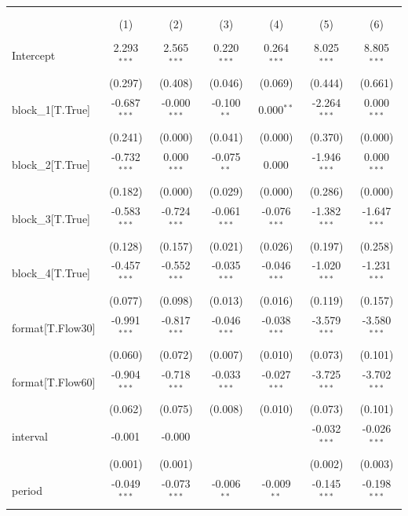 \begin{table}[!htbp] \centering
\begin{tabular}{@{\extracolsep{5pt}}lcccccc}
\\[-1.8ex]\hline
\hline \\[-1.8ex]
\\[-1.8ex] & (1) & (2) & (3) & (4) & (5) & (6) \\
\hline \\[-1.8ex]
 Intercept & 2.293$^{***}$ & 2.565$^{***}$ & 0.220$^{***}$ & 0.264$^{***}$ & 8.025$^{***}$ & 8.805$^{***}$ \\
& (0.297) & (0.408) & (0.046) & (0.069) & (0.444) & (0.661) \\
 block_1[T.True] & -0.687$^{***}$ & -0.000$^{***}$ & -0.100$^{**}$ & 0.000$^{**}$ & -2.264$^{***}$ & 0.000$^{***}$ \\
& (0.241) & (0.000) & (0.041) & (0.000) & (0.370) & (0.000) \\
 block_2[T.True] & -0.732$^{***}$ & 0.000$^{***}$ & -0.075$^{**}$ & 0.000$^{}$ & -1.946$^{***}$ & 0.000$^{***}$ \\
& (0.182) & (0.000) & (0.029) & (0.000) & (0.286) & (0.000) \\
 block_3[T.True] & -0.583$^{***}$ & -0.724$^{***}$ & -0.061$^{***}$ & -0.076$^{***}$ & -1.382$^{***}$ & -1.647$^{***}$ \\
& (0.128) & (0.157) & (0.021) & (0.026) & (0.197) & (0.258) \\
 block_4[T.True] & -0.457$^{***}$ & -0.552$^{***}$ & -0.035$^{***}$ & -0.046$^{***}$ & -1.020$^{***}$ & -1.231$^{***}$ \\
& (0.077) & (0.098) & (0.013) & (0.016) & (0.119) & (0.157) \\
 format[T.Flow30] & -0.991$^{***}$ & -0.817$^{***}$ & -0.046$^{***}$ & -0.038$^{***}$ & -3.579$^{***}$ & -3.580$^{***}$ \\
& (0.060) & (0.072) & (0.007) & (0.010) & (0.073) & (0.101) \\
 format[T.Flow60] & -0.904$^{***}$ & -0.718$^{***}$ & -0.033$^{***}$ & -0.027$^{***}$ & -3.725$^{***}$ & -3.702$^{***}$ \\
& (0.062) & (0.075) & (0.008) & (0.010) & (0.073) & (0.101) \\
 interval & -0.001$^{}$ & -0.000$^{}$ & & & -0.032$^{***}$ & -0.026$^{***}$ \\
& (0.001) & (0.001) & & & (0.002) & (0.003) \\
 period & -0.049$^{***}$ & -0.073$^{***}$ & -0.006$^{**}$ & -0.009$^{**}$ & -0.145$^{***}$ & -0.198$^{***}$ \\

\end{tabular}
\end{table}
